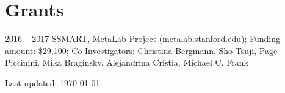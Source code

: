\documentclass[letterpaper]{article}
\def\footerlink{}
\renewenvironment{itemize}{
  \begin{list}{}{
    \setlength{\leftmargin}{1.5em}
  }
}{
  \end{list}
}
\begin{document}
\section*{Grants}
\begin{itemize}
\item 2016 -- 2017 SSMART, MetaLab Project (metalab.stanford.edu); Funding amount: \$29,100; Co-Investigators: Christina Bergmann, Sho
Tsuji, Page Piccinini, Mika Braginsky, Alejandrina Cristia, Michael C. Frank
\end{itemize}



\bigskip

\begin{center}
  \begin{footnotesize}
    Last updated: \today \\
    \href{\footerlink}{\texttt{\footerlink}}
  \end{footnotesize}
\end{center}
\end{document}
